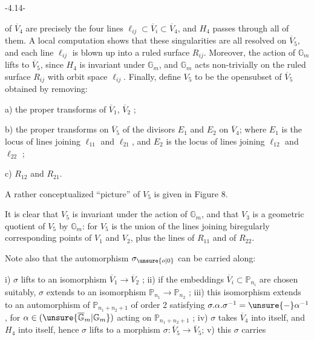 \begin{center}-4.14-\end{center}

of $\overline V_4$ are precisely the four lines $\ell_{ij}\subset\overline V_i\subset\overline V_4$, and $H_4$ passes through all of them. A local computation shows that these singularities are all resolved on $\overline V_5$, and each line $\ell_{ij}$ is blown up into a ruled surface $R_{ij}$. Moreover, the action of $\mathbb G_m$ lifts to $\overline V_5$, since $H_4$ is invariant under $\mathbb G_m$, and $\mathbb G_m$ acts non-trivially on the ruled surface $R_{ij}$ with orbit space $\ell_{ij}$. Finally, define $V_5$ to be the opensubset of $\overline V_5$ obtained by removing:
\margin{$\unsure{\sim\sim}$}

a) the proper transforms of $\overline V_1$, $\overline V_2$ ;

b) the proper transforms on $\overline V_5$ of the divisors $E_1$ and $E_2$ on $\overline V_4$; where $E_1$ is the locus of lines joining $\ell_{11}$ and $\ell_{21}$, and $E_2$ is the locus of lines joining $\ell_{12}$ and $\ell_{22}$ ;

c) $R_{12}$ and $R_{21}$.

A rather conceptualized ``picture'' of $V_5$ is given in Figure 8.

It is clear that $V_5$ is invariant under the action of $\mathbb G_m$, and that $V_3$ is a geometric quotient of $V_5$ by $\mathbb G_m$: for $V_5$ is the union of the lines joining biregularly corresponding points of $V_1$ and $V_2$, plus the lines of $R_{11}$ and of $R_{22}$.

Note also that the automorphism $\sigma_{\unsure{o|0}}$ can be carried along:

i) $\sigma$ lifts to an isomorphism $\overline V_1\longrightarrow\overline V_2$ ; ii) if the embeddings $\overline V_i\subset\mathbb P_{n_i}$ are chosen suitably, $\sigma$ extends to an isomorphism $\mathbb P_{n_1}\longrightarrow\mathbb P_{n_2}$ ; iii) this isomorphism extends to an automorphism of $\mathbb P_{n_1+n_2+1}$ of order 2 satisfying $\sigma.\alpha.\sigma^{-1}=\unsure{-}\alpha^{-1}$, for $\alpha\in(\unsure{\overline{\mathbb G}_m|\mathbb G_m})$ acting on $\mathbb P_{n_1+n_2+1}$ ; iv) $\sigma$ takes $\overline V_4$ into itself, and $H_4$ into itself, hence $\sigma$ lifts to a morphism $\sigma:\overline V_5\longrightarrow\overline V_5$; v) this $\sigma$ carries
